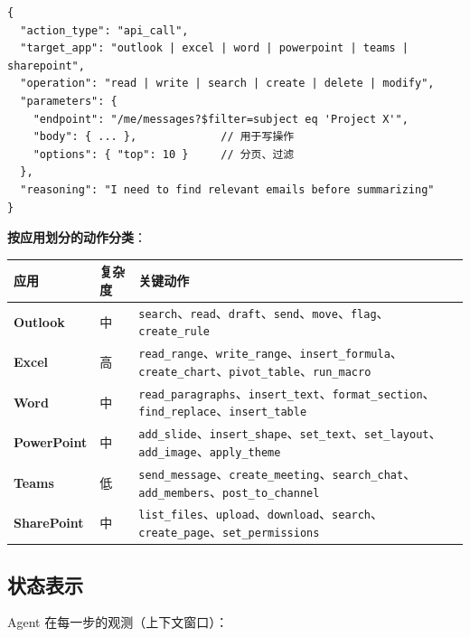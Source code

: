 \begin{examplebox}
\begin{lstlisting}[style=pythonstyle]
{
  "action_type": "api_call",
  "target_app": "outlook | excel | word | powerpoint | teams | sharepoint",
  "operation": "read | write | search | create | delete | modify",
  "parameters": {
    "endpoint": "/me/messages?$filter=subject eq 'Project X'",
    "body": { ... },             // 用于写操作
    "options": { "top": 10 }     // 分页、过滤
  },
  "reasoning": "I need to find relevant emails before summarizing"
}
\end{lstlisting}
\end{examplebox}

\textbf{按应用划分的动作分类}：

\noindent\begin{tabularx}{\linewidth}{@{}l Z{0.3} Z{1.7}@{}}
\toprule
\textbf{应用} & \textbf{复杂度} & \textbf{关键动作} \\
\midrule
\textbf{Outlook} & 中 & \texttt{search}、\texttt{read}、\texttt{draft}、\texttt{send}、\texttt{move}、\texttt{flag}、\texttt{create\_rule} \\
\textbf{Excel} & 高 & \texttt{read\_range}、\texttt{write\_range}、\texttt{insert\_formula}、\texttt{create\_chart}、\texttt{pivot\_table}、\texttt{run\_macro} \\
\textbf{Word} & 中 & \texttt{read\_paragraphs}、\texttt{insert\_text}、\texttt{format\_section}、\texttt{find\_replace}、\texttt{insert\_table} \\
\textbf{PowerPoint} & 中 & \texttt{add\_slide}、\texttt{insert\_shape}、\texttt{set\_text}、\texttt{set\_layout}、\texttt{add\_image}、\texttt{apply\_theme} \\
\textbf{Teams} & 低 & \texttt{send\_message}、\texttt{create\_meeting}、\texttt{search\_chat}、\texttt{add\_members}、\texttt{post\_to\_channel} \\
\textbf{SharePoint} & 中 & \texttt{list\_files}、\texttt{upload}、\texttt{download}、\texttt{search}、\texttt{create\_page}、\texttt{set\_permissions} \\
\bottomrule
\end{tabularx}

\subsection{状态表示}
\label{state-representation}

Agent 在每一步的观测（上下文窗口）：

